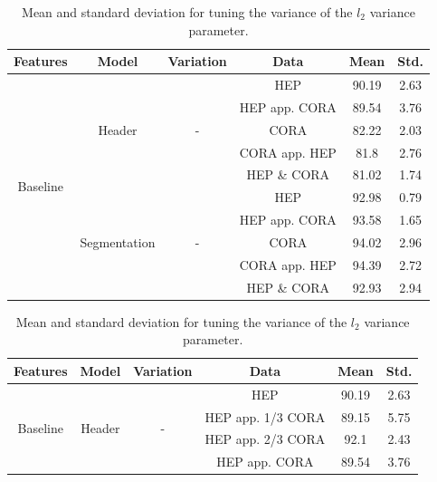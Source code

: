 \begin{table}[h]
\begin{center}
\begin{tabular}{|c|c|c|c|c|c|}
\hline
Features & Model & Variation & Data & Mean & Std.\\
\hline
\multirow{10}{*}{Baseline} & \multirow{5}{*}{Header} & \multirow{5}{*}{-} & HEP & 90.19 & 2.63\\\cline{4-6}
& & & HEP app. CORA & 89.54 & 3.76\\\cline{4-6}
& & & CORA & 82.22 & 2.03\\\cline{4-6}
& & & CORA app. HEP & 81.8 & 2.76\\\cline{4-6}
& & & HEP \& CORA & 81.02 & 1.74\\\cline{2-6}
& \multirow{5}{*}{Segmentation} & \multirow{5}{*}{-} & HEP & 92.98 & 0.79\\\cline{4-6}
& & & HEP app. CORA & 93.58 & 1.65\\\cline{4-6}
& & & CORA & 94.02 & 2.96\\\cline{4-6}
& & & CORA app. HEP & 94.39 & 2.72\\\cline{4-6}
& & & HEP \& CORA & 92.93 & 2.94\\\cline{4-6}
\hline
\end{tabular}
\caption[Mean and standard deviation for tuning the variance of the $l_2$ variance parameter.]{Mean and standard deviation for tuning the variance of the $l_2$ variance parameter.}
\label{table:baselineresults}
\end{center}
\end{table}

\begin{table}[h]
\begin{center}
\begin{tabular}{|c|c|c|c|c|c|}
\hline
Features & Model & Variation & Data & Mean & Std.\\
\hline
\multirow{4}{*}{Baseline} & \multirow{4}{*}{Header} & \multirow{4}{*}{-} & HEP & 90.19 & 2.63\\\cline{4-6}
& & & HEP app. 1/3 CORA & 89.15 & 5.75\\\cline{4-6}
& & & HEP app. 2/3 CORA & 92.1 & 2.43\\\cline{4-6}
& & & HEP app. CORA & 89.54 & 3.76\\\cline{4-6}
\hline
\end{tabular}
\caption[Mean and standard deviation for tuning the variance of the $l_2$ variance parameter.]{Mean and standard deviation for tuning the variance of the $l_2$ variance parameter.}
\label{table:subsampling}
\end{center}
\end{table}

